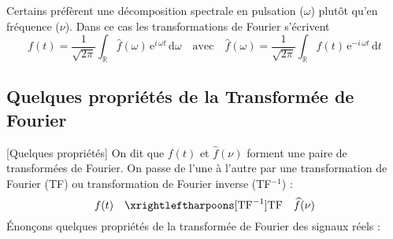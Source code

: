 
\begin{kaoremark}
Certains préfèrent une décomposition spectrale en pulsation (\(\omega\)) plutôt qu'en fréquence (\(\nu\)). Dans ce cas les transformations de Fourier s'écrivent
\[
f(t)=\frac{1}{\sqrt{2\pi}}\int_{\mathbb{R}} \widehat{f}(\omega)\,\mathrm{e}^{i\,\omega t}\, \mathrm{d}\omega
\quad\text{avec}\quad
\widehat{f}(\omega)=\frac{1}{\sqrt{2\pi}}\int_{\mathbb{R}}f(t)\,\mathrm{e}^{-i\,\omega t}\,\mathrm{d}t
\]
\end{kaoremark}
\subsection{Quelques propriétés de la Transformée de Fourier}[Quelques propriétés] %
\label{sub:proprietes_de_la_transformee_de_fourier}
On dit que \(f(t)\) et \(\widehat{f}(\nu)\) forment une paire de transformées de Fourier. On passe de l'une à l'autre par une transformation de Fourier (TF) ou transformation de Fourier inverse (TF\(^{-1}\)) :
\[
f(t) \quad\xrightleftharpoons[\text{TF}^{-1}]{\text{TF}}\quad \widehat{f}(\nu)
\]
Énonçons quelques propriétés de la transformée de Fourier des signaux réels :
